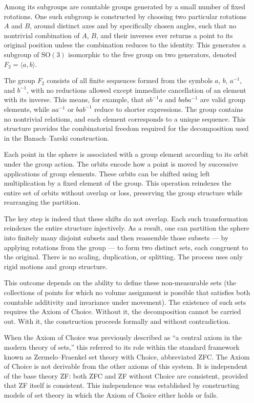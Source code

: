 Among its subgroups are countable groups generated by a small number of fixed rotations. One such subgroup is constructed by choosing two particular rotations $A$ and $B$, around distinct axes and by specifically chosen angles, such that no nontrivial combination of $A$, $B$, and their inverses ever returns a point to its original position unless the combination reduces to the identity. This generates a subgroup of $\mathrm{SO}(3)$ isomorphic to the free group on two generators, denoted $F_2 = \langle a, b \rangle$.

The group $F_2$ consists of all finite sequences formed from the symbols $a$, $b$, $a^{-1}$, and $b^{-1}$, with no reductions allowed except immediate cancellation of an element with its inverse. This means, for example, that $ab^{-1}a$ and $baba^{-1}$ are valid group elements, while $aa^{-1}$ or $bab^{-1}$ reduce to shorter expressions. The group contains no nontrivial relations, and each element corresponds to a unique sequence. This structure provides the combinatorial freedom required for the decomposition used in the Banach–Tarski construction.

Each point in the sphere is associated with a group element according to its orbit under the group action. The orbits encode how a point is moved by successive applications of group elements. These orbits can be shifted using left multiplication by a fixed element of the group. This operation reindexes the entire set of orbits without overlap or loss, preserving the group structure while rearranging the partition.

The key step is indeed that these shifts do not overlap. Each such transformation reindexes the entire structure injectively. As a result, one can partition the sphere into finitely many disjoint subsets and then reassemble those subsets — by applying rotations from the group — to form two distinct sets, each congruent to the original. There is no scaling, duplication, or splitting. The process uses only rigid motions and group structure.

This outcome depends on the ability to define these non-measurable sets (the collections of points for which no volume assignment is possible that satisfies both countable additivity and invariance under movement). The existence of such sets requires the Axiom of Choice. Without it, the decomposition cannot be carried out. With it, the construction proceeds formally and without contradiction.

When the Axiom of Choice was previously described as “a central axiom in the modern theory of sets,” this referred to its role within the standard framework known as Zermelo–Fraenkel set theory with Choice, abbreviated ZFC. The Axiom of Choice is not derivable from the other axioms of this system. It is independent of the base theory ZF: both ZFC and ZF without Choice are consistent, provided that ZF itself is consistent. This independence was established by constructing models of set theory in which the Axiom of Choice either holds or fails. 

